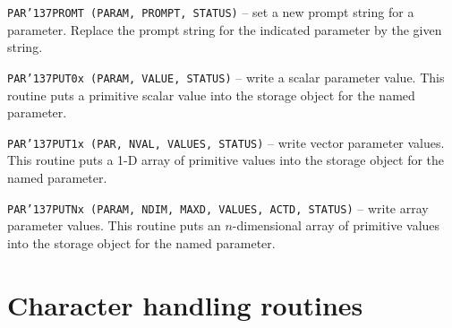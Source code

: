 \documentclass[twoside,11pt]{article}
\renewcommand{\_}{{\tt\char'137}}
\newcommand{\xlabel}[1]{}
\begin{document}
\begin{description}
\item{\tt PAR\_PROMT (PARAM, PROMPT, STATUS)}
-- set a new prompt string for a parameter.
Replace the prompt string for the indicated parameter by the
given string.


\item{\tt PAR\_PUT0x (PARAM, VALUE, STATUS)}
-- write a scalar parameter value.
This routine puts a primitive scalar value into the storage object
for the named parameter.



\item{\tt PAR\_PUT1x (PAR, NVAL, VALUES, STATUS)}
-- write vector parameter values.
This routine puts a 1-D array of primitive values into the storage
object for the named parameter.


\item{\tt PAR\_PUTNx (PARAM, NDIM, MAXD, VALUES, ACTD, STATUS)}
-- write array parameter values.
This routine puts an $n$-dimensional array of primitive values into
the storage object
for the named parameter.

\end{description}

\newpage
\section{Character handling routines\label{apxchar}\xlabel{character_handling_routines}}
\end{document}
